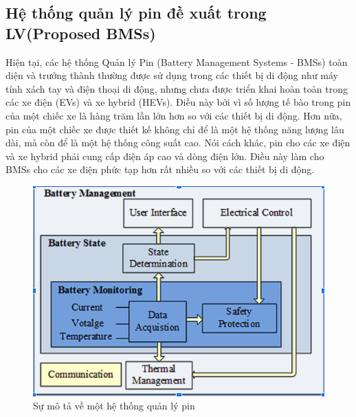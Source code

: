 \documentclass[a4paper,11pt]{article}
\theoremstyle{mytheor}
\begin{document}
\subsection{Hệ thống quản lý pin đề xuất trong LV(Proposed BMSs)}
Hiện tại, các hệ thống Quản lý Pin (Battery Management Systems - BMSs) toàn diện và trưởng thành thường được sử dụng trong các thiết bị di động như máy tính xách tay và điện thoại di động, nhưng chưa được triển khai hoàn toàn trong các xe điện (EVs) và xe hybrid (HEVs). Điều này bởi vì số lượng tế bào trong pin của một chiếc xe là hàng trăm lần lớn hơn so với các thiết bị di động. Hơn nữa, pin của một chiếc xe được thiết kế không chỉ để là một hệ thống năng lượng lâu dài, mà còn để là một hệ thống công suất cao. Nói cách khác, pin cho các xe điện và xe hybrid phải cung cấp điện áp cao và dòng điện lớn. Điều này làm cho BMSs cho các xe điện phức tạp hơn rất nhiều so với các thiết bị di động.\\ 
\vspace{7cm}
\begin{figure}
    \centering
    \includegraphics{bms.png}
    \caption{Sự mô tả về một hệ thống quản lý pin }
    \label{fig:enter-label}
\end{figure}

\vspace{7cm}
\end{document}
